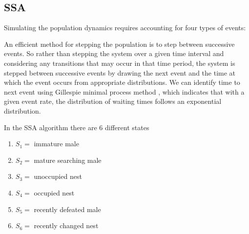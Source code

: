\documentclass[a4paper,11pt]{article}
\begin{document}
\subsection{SSA}
Simulating the population dynamics requires accounting for four types of events:

An efficient method for stepping the population is to step between successive events. So rather than stepping the system over a given time interval and considering any transitions that may occur in that time period, the system is stepped between successive events by drawing the next event and the time at which the event occurs from appropriate distributions.  We can identify time to next event using Gillespie minimal process method \citep{Gillespie-1976}, which indicates that with a given event rate, the distribution of waiting times follows an exponential distribution.


In the SSA algorithm \citep{Gillespie-1976} there are 6 different states
\begin{enumerate}
    \item $S_1 = $ immature male
    \item $S_2 = $ mature searching male
    \item $S_3 = $ unoccupied nest
    \item $S_4 = $ occupied nest
    \item $S_5 = $ recently defeated male
    \item $S_6 = $ recently changed nest
\end{enumerate}
\end{document}
